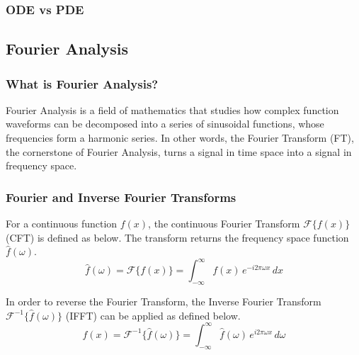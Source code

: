 \subsubsection{ODE vs PDE}

\subsection{Fourier Analysis}
\subsubsection{What is Fourier Analysis?}
Fourier Analysis is a field of mathematics that studies how complex function waveforms can be decomposed into a series of sinusoidal functions, whose frequencies form a harmonic series. In other words, the Fourier Transform (FT), the cornerstone of Fourier Analysis, turns a signal in time space into a signal in frequency space.

\subsubsection{Fourier and Inverse Fourier Transforms}
\begin{definition}
    For a continuous function $f(x)$, the continuous Fourier Transform $\mathcal{F}\{ f(x) \}$ (CFT) is defined as below. The transform returns the frequency space function $\hat{f}(\omega)$.
    \[ \hat{f}(\omega) = \mathcal{F}\{ f(x) \} = \int_{-\infty}^{\infty} f(x)  \, e^{-i 2\pi \omega x} \,dx \]
\end{definition}

\begin{definition}
    In order to reverse the Fourier Transform, the Inverse Fourier Transform $\mathcal{F}^{-1}\{ \hat{f}(\omega) \}$ (IFFT) can be applied as defined below.
    \[ f(x) = \mathcal{F}^{-1}\{ \hat{f}(\omega) \} = \int_{-\infty}^{\infty} \hat{f}(\omega) \, e^{i 2\pi \omega x} \,d \omega \]
\end{definition}